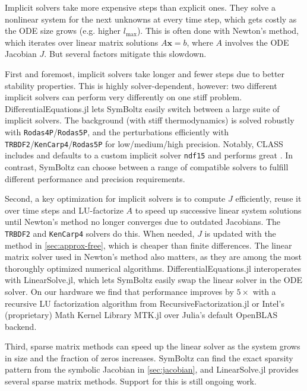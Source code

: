 \documentclass{aa}
\newcommand\lmax{l_\text{max}}
\begin{document}
Implicit solvers take more expensive steps than explicit ones.
They solve a nonlinear system for the next unknowns at every time step, which gets costly as the ODE size grows (e.g. higher $\lmax$).
This is often done with Newton's method, which iterates over linear matrix solutions $A\boldsymbol{x} = b$, where $A$ involves the ODE Jacobian $J$.
But several factors mitigate this slowdown.

First and foremost, implicit solvers take longer and fewer steps due to better stability properties.
This is highly solver-dependent, however: two different implicit solvers can perform very differently on one stiff problem.
DifferentialEquations.jl lets SymBoltz easily switch between a large suite of implicit solvers.
The background (with stiff thermodynamics) is solved robustly with \texttt{Rodas4P}/\texttt{Rodas5P}, and the perturbations efficiently with \texttt{TRBDF2}/\texttt{KenCarp4}/\texttt{Rodas5P} for low/medium/high precision.
Notably, CLASS includes and defaults to a custom implicit solver \texttt{ndf15} and performs great \citep{lesgourguesCosmicLinearAnisotropy2011a}.
In contrast, SymBoltz can choose between a range of compatible solvers to fulfill different performance and precision requirements.

Second, a key optimization for implicit solvers is to compute $J$ efficiently, reuse it over time steps and LU-factorize $A$ to speed up successive linear system solutions until Newton's method no longer converges due to outdated Jacobians.
The \texttt{TRBDF2} and \texttt{KenCarp4} solvers do this.
When needed, $J$ is updated with the method in \cref{sec:approx-free}, which is cheaper than finite differences.
The linear matrix solver used in Newton's method also matters, as they are among the most thoroughly optimized numerical algorithms.
DifferentialEquations.jl interoperates with LinearSolve.jl, which lets SymBoltz easily swap the linear solver in the ODE solver.
On our hardware we find that performance improves by $5\times$ with a recursive LU factorization algorithm from RecursiveFactorization.jl or Intel's (proprietary) Math Kernel Library MTK.jl over Julia's default OpenBLAS backend.

Third, sparse matrix methods can speed up the linear solver as the system grows in size and the fraction of zeros increases.
SymBoltz can find the exact sparsity pattern from the symbolic Jacobian in \cref{sec:jacobian}, and LinearSolve.jl provides several sparse matrix methods.
Support for this is still ongoing work.
\end{document}
